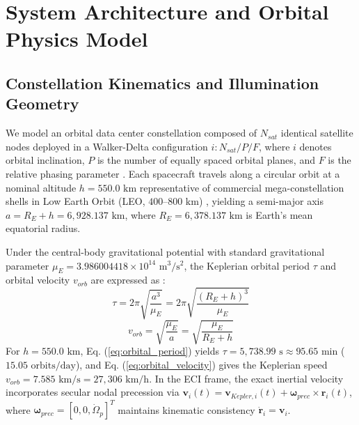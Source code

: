 \documentclass[journal]{IEEEtran}
\begin{document}
\section{System Architecture and Orbital Physics Model}

\subsection{Constellation Kinematics and Illumination Geometry}
We model an orbital data center constellation composed of $N_{sat}$ identical satellite nodes deployed in a Walker-Delta configuration $i: N_{sat} / P / F$, where $i$ denotes orbital inclination, $P$ is the number of equally spaced orbital planes, and $F$ is the relative phasing parameter \cite{walker1984satellite, curtis2014orbital, delportillo2019technical}. Each spacecraft travels along a circular orbit at a nominal altitude $h = 550.0\text{ km}$ representative of commercial mega-constellation shells in Low Earth Orbit (LEO, $400\text{--}800\text{ km}$) \cite{delportillo2019technical}, yielding a semi-major axis $a = R_E + h = 6,928.137\text{ km}$, where $R_E = 6,378.137\text{ km}$ is Earth's mean equatorial radius.

Under the central-body gravitational potential with standard gravitational parameter $\mu_E = 3.986004418 \times 10^{14}\text{ m}^3/\text{s}^2$, the Keplerian orbital period $\tau$ and orbital velocity $v_{orb}$ are expressed as \cite{curtis2014orbital}:
\begin{equation}
    \tau = 2\pi \sqrt{\frac{a^3}{\mu_E}} = 2\pi \sqrt{\frac{(R_E + h)^3}{\mu_E}}
    \label{eq:orbital_period}
\end{equation}
\begin{equation}
    v_{orb} = \sqrt{\frac{\mu_E}{a}} = \sqrt{\frac{\mu_E}{R_E + h}}
    \label{eq:orbital_velocity}
\end{equation}
For $h = 550.0\text{ km}$, Eq. (\ref{eq:orbital_period}) yields $\tau = 5,738.99\text{ s} \approx 95.65\text{ min}$ ($15.05\text{ orbits/day}$), and Eq. (\ref{eq:orbital_velocity}) gives the Keplerian speed $v_{orb} = 7.585\text{ km/s} = 27,306\text{ km/h}$. In the ECI frame, the exact inertial velocity incorporates secular nodal precession via $\mathbf{v}_i(t) = \mathbf{v}_{Kepler,i}(t) + \boldsymbol{\omega}_{prec} \times \mathbf{r}_i(t)$, where $\boldsymbol{\omega}_{prec} = [0, 0, \dot{\Omega}_p]^T$ maintains kinematic consistency $\dot{\mathbf{r}}_i = \mathbf{v}_i$.
\end{document}
